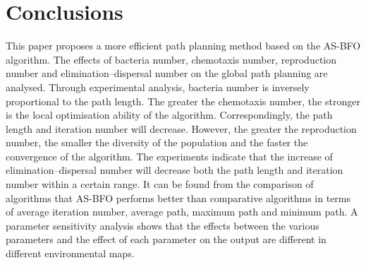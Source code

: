 \documentclass{PDS}%
\theoremstyle{definition}
\begin{document}
\section{Conclusions}\label{sec5}

This paper proposes a more efficient path planning method based on the AS-BFO algorithm. The
effects of bacteria number, chemotaxis number, reproduction number and
elimination--dispersal number on the global path planning are analysed. Through
experimental analysis, bacteria number is inversely proportional to the path length. The
greater the chemotaxis number, the stronger is the local optimisation ability of the algorithm.
Correspondingly, the path length and iteration number will decrease. However, the greater the
reproduction number, the smaller the diversity of the population and the faster the convergence
of the algorithm. The experiments indicate that the increase of elimination--dispersal
number will decrease both the path length and iteration number within  a certain range. It
can be found from the comparison of algorithms that AS-BFO performs better than
comparative algorithms in terms of average iteration number, average path,
maximum path and minimum path. A parameter sensitivity analysis shows that the effects
between the various parameters and the effect of each parameter on the output are
different in different environmental maps.
\end{document}
